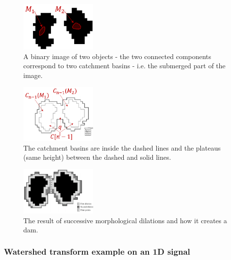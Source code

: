 \documentclass[a4paper]{article}
\begin{document}
 \begin{multicols}{3}
 
 \begin{figure}[H]
	\centering %
    	\includegraphics[width=3.8cm]{img/watershed/watershed_grid_dam1.PNG}
    \caption{A binary image of two objects - the two connected components correspond to two catchment basins - i.e. the submerged part of the image.}
    \label{fig:bw_illustration_cb}
  \end{figure}
 \columnbreak
  \begin{figure}[H]
	\centering %
    	\includegraphics[width=3.8cm]{img/watershed/watershed_grid_dam2.PNG}
    \caption{The catchment basins are inside the dashed lines and the plateaus (same height) between the dashed and solid lines.}
  \end{figure}
  \columnbreak
   \begin{figure}[H]
	\centering %
    	\includegraphics[width=3.8cm]{img/watershed/watershed_grid_dam3.PNG}
    \caption{The result of successive morphological dilations and how it creates a dam.}
  \end{figure}
  
 \end{multicols}
 
 
 
 \subsubsection{Watershed transform example on an 1D signal}
\end{document}
